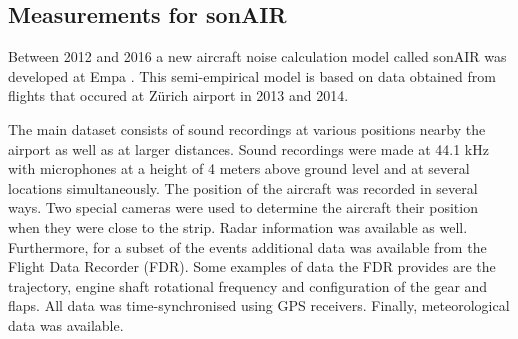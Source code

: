 %
%
%
%
%
%
%
%


\subsection{Measurements for sonAIR}\label{sec:introduction:sonair}
Between 2012 and 2016 a new aircraft noise calculation model called sonAIR was
developed at Empa \cite{Zellmann2013,Zellmann2016}. This semi-empirical model is
based on data obtained from flights that occured at Z\"{u}rich airport in 2013 and
2014.

The main dataset consists of sound recordings at various positions nearby the
airport as well as at larger distances. Sound recordings were made at 44.1 kHz with
microphones at a height of 4 meters above ground level and at several locations
simultaneously. The position of the aircraft was recorded in several ways. Two
special cameras were used to determine the aircraft their position when they
were close to the strip. Radar information was available as well. Furthermore,
for a subset of the events additional data was available from the Flight Data
Recorder (FDR). Some examples of data the FDR provides are the trajectory,
engine shaft rotational frequency and configuration of the gear and flaps. All
data was time-synchronised using GPS receivers. Finally, meteorological data was
available.

